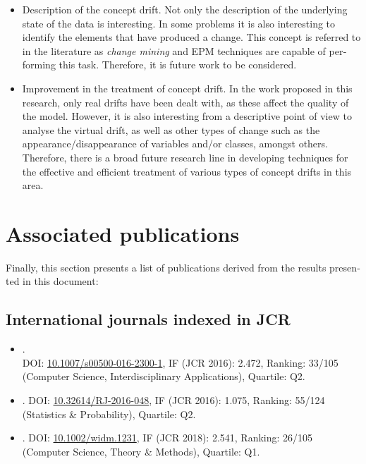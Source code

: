 \documentclass[c5paper,10pt,twoside]{book}	   	%
\newcommand{\doi}[1]{\href{https://doi.org/#1}{#1}}
\begin{document}
\begin{otherlanguage}{british}
\begin{itemize}
	
			
	\item Description of the concept drift. Not only the description of the underlying state of the data is interesting. In some problems it is also interesting to identify the elements that have produced a change. This concept is referred to in the literature as \textit{change mining} \cite{Boe11} and \ac{EPM} techniques are capable of performing this task. Therefore, it is future work to be considered.
			
	\item Improvement in the treatment of concept drift. In the work proposed in this research, only real drifts have been dealt with, as these affect the quality of the model. However, it is also interesting from a descriptive point of view to analyse the virtual drift, as well as other types of change such as the appearance/disappearance of variables and/or classes, amongst others. Therefore, there is a broad future research line in developing techniques for the effective and efficient treatment of various types of concept drifts in this area.
			
		\end{itemize}
		
\section{Associated publications} \label{sec:relacionadas2}
		
		Finally, this section presents a list of publications derived from the results presented in this document:
		
\subsection{International journals indexed in JCR}
		
		\begin{itemize}
		\item {}. \\ DOI: \doi{10.1007/s00500-016-2300-1}, IF (JCR 2016): 2.472, Ranking: 33/105 (Computer Science, Interdisciplinary Applications), Quartile: Q2.

\item {}. DOI: \doi{10.32614/RJ-2016-048}, IF (JCR 2016): 1.075, Ranking: 55/124 (Statistics \& Probability), Quartile: Q2.

\item {}. DOI: \doi{10.1002/widm.1231}, IF (JCR 2018): 2.541, Ranking: 26/105 (Computer Science, Theory \& Methods), Quartile: Q1.


\end{itemize}
\end{otherlanguage}
\end{document}
